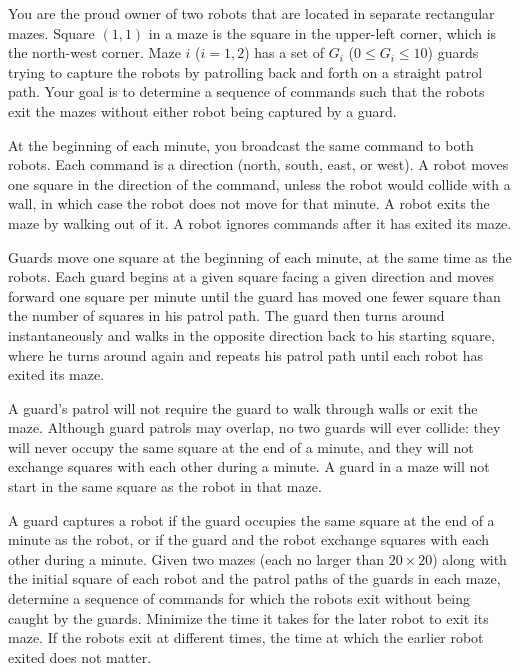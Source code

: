 You are the proud owner of two robots that are located in separate rectangular mazes. Square $(1,1)$ in a maze is the square in the upper-left corner, which is the north-west corner. Maze $i$ ($i = 1,2$) has a set of $G_i$ ($0 \leq G_i \leq 10$) guards trying to capture the robots by patrolling back and forth on a straight patrol path. Your goal is to determine a sequence of commands such that the robots exit the mazes without either robot being captured by a guard.

At the beginning of each minute, you broadcast the same command to both robots. Each command is a direction (north, south, east, or west). A robot moves one square in the direction of the command, unless the robot would collide with a wall, in which case the robot does not move for that minute. A robot exits the maze by walking out of it. A robot ignores commands after it has exited its maze.

Guards move one square at the beginning of each minute, at the same time as the robots. Each guard begins at a given square facing a given direction and moves forward one square per minute until the guard has moved one fewer square than the number of squares in his patrol path. The guard then turns around instantaneously and walks in the opposite direction back to his starting square, where he turns around again and repeats his patrol path until each robot has exited its maze.

A guard's patrol will not require the guard to walk through walls or exit the maze. Although guard patrols may overlap, no two guards will ever collide: they will never occupy the same square at the end of a minute, and they will not exchange squares with each other during a minute. A guard in a maze will not start in the same square as the
robot in that maze.

A guard captures a robot if the guard occupies the same square at the end of a minute as the robot, or if the guard and the robot exchange squares with each other during a minute. Given two mazes (each no larger than $20\times 20$) along with the initial square of each robot and the patrol paths of the guards in each maze, determine a sequence of commands for which the robots exit without being caught by the guards. Minimize the time it takes for the later robot to exit its maze. If the robots exit at different times, the time at which the earlier robot exited does not matter.